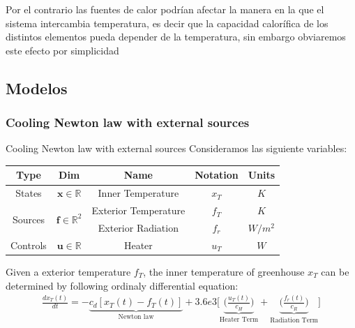     Por el contrario las fuentes de calor podrían afectar la manera en la que el sistema intercambia  temperatura, es decir que la capacidad calorífica de los distintos elementos pueda depender de la temperatura, sin embargo obviaremos este efecto por simplicidad
    
    \subsection{Modelos }
    
    \subsubsection{Cooling Newton law with external sources}
    
    \begin{model}{Cooling Newton law with external sources}{}\label{model:CoolNewton}
    Consideramos las siguiente variables: 
    \begin{center}
        \begin{tabular}{|c|c|c|c|c|}
            \hline
            \textbf{Type} & \textbf{Dim} &\textbf{Name} & \textbf{Notation} & \textbf{Units} \\
                \hline
                \multirow{1}{*}{States}  & $\bm{x} \in \mathbb{R}$& Inner Temperature & $x_{T}$ & $K$ \\
                \hline
                \hline
                \multirow{2}{*}{Sources} & \multirow{2}{*}{$\bm{f} \in \mathbb{R}^2$} & Exterior Temperature & $f_{T}$ & $K$ \\
                & & Exterior Radiation & $f_{r}$ & $W/m^2$ \\
                \hline
                \hline
                \multirow{1}{*}{Controls} & $\bm{u} \in \mathbb{R}$ & Heater         & $u_{T}$ & $W$ \\
                \hline
        \end{tabular}    
    \end{center}
        Given a exterior temperature $f_{T}$, the inner temperature of greenhouse $x_{T}$ can be determined by following ordinaly differential equation:  
        \begin{gather}\label{eq:CoolNewton_plus_sources}
            \frac{dx_{T}(t)}{dt} = -\underbrace{c_d[x_{T}(t) - f_{T}(t)]}_{\text{Newton law}} + 
            3.6e3  \Bigg[ 
                \underbrace{ \Bigg( \frac{u_{T}(t)}{c_H} \Bigg) }_{\text{Heater Term}} + 
                \underbrace{ \Bigg( \frac{f_{r}(t)}{ c_R } \Bigg) }_{\text{Radiation Term}} \Bigg]

\end{gather}
\end{model}
